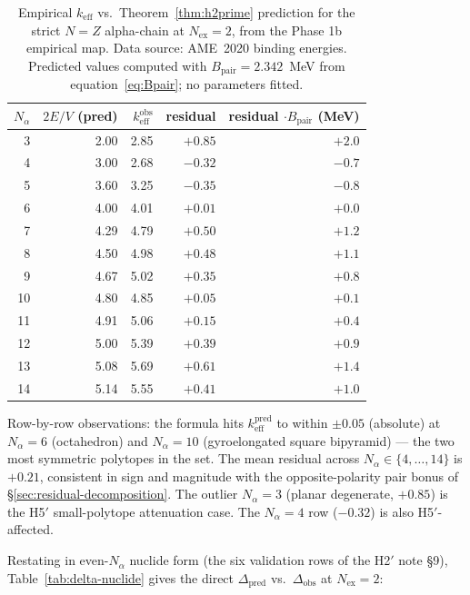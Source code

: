 \documentclass[11pt,letterpaper]{article}
\theoremstyle{definition}
\newcommand{\Bpair}{B_{\text{pair}}}
\newcommand{\Nalpha}{N_\alpha}
\newcommand{\Nex}{N_{\text{ex}}}
\begin{document}
\begin{table}[h]
\centering
\caption{Empirical $k_{\text{eff}}$ vs.\ Theorem~\ref{thm:h2prime} prediction for the strict $N = Z$ alpha-chain at $\Nex = 2$, from the Phase 1b empirical map. Data source: AME~2020 binding energies. Predicted values computed with $\Bpair = 2.342$~MeV from equation~\eqref{eq:Bpair}; no parameters fitted.}
\label{tab:k-eff}
\begin{tabular}{@{}rrrrr@{}}
\toprule
$\Nalpha$ & $2E/V$ (pred) & $k_{\text{eff}}^{\text{obs}}$ & residual & residual $\cdot \Bpair$ (MeV) \\
\midrule
3 & 2.00 & 2.85 & $+0.85$ & $+2.0$ \\
4 & 3.00 & 2.68 & $-0.32$ & $-0.7$ \\
5 & 3.60 & 3.25 & $-0.35$ & $-0.8$ \\
6 & 4.00 & 4.01 & $\mathbf{+0.01}$ & $\mathbf{+0.0}$ \\
7 & 4.29 & 4.79 & $+0.50$ & $+1.2$ \\
8 & 4.50 & 4.98 & $+0.48$ & $+1.1$ \\
9 & 4.67 & 5.02 & $+0.35$ & $+0.8$ \\
10 & 4.80 & 4.85 & $\mathbf{+0.05}$ & $\mathbf{+0.1}$ \\
11 & 4.91 & 5.06 & $+0.15$ & $+0.4$ \\
12 & 5.00 & 5.39 & $+0.39$ & $+0.9$ \\
13 & 5.08 & 5.69 & $+0.61$ & $+1.4$ \\
14 & 5.14 & 5.55 & $+0.41$ & $+1.0$ \\
\bottomrule
\end{tabular}
\end{table}

Row-by-row observations: the formula hits $k_{\text{eff}}^{\text{pred}}$ to within $\pm 0.05$ (absolute) at $\Nalpha = 6$ (octahedron) and $\Nalpha = 10$ (gyroelongated square bipyramid) --- the two most symmetric polytopes in the set. The mean residual across $\Nalpha \in \{4, \ldots, 14\}$ is $+0.21$, consistent in sign and magnitude with the opposite-polarity pair bonus of \S\ref{sec:residual-decomposition}. The outlier $\Nalpha = 3$ (planar degenerate, $+0.85$) is the H5$'$ small-polytope attenuation case. The $\Nalpha = 4$ row ($-0.32$) is also H5$'$-affected.

Restating in even-$\Nalpha$ nuclide form (the six validation rows of the H2$'$ note \S9), Table~\ref{tab:delta-nuclide} gives the direct $\Delta_{\text{pred}}$ vs.\ $\Delta_{\text{obs}}$ at $\Nex = 2$:
\end{document}
